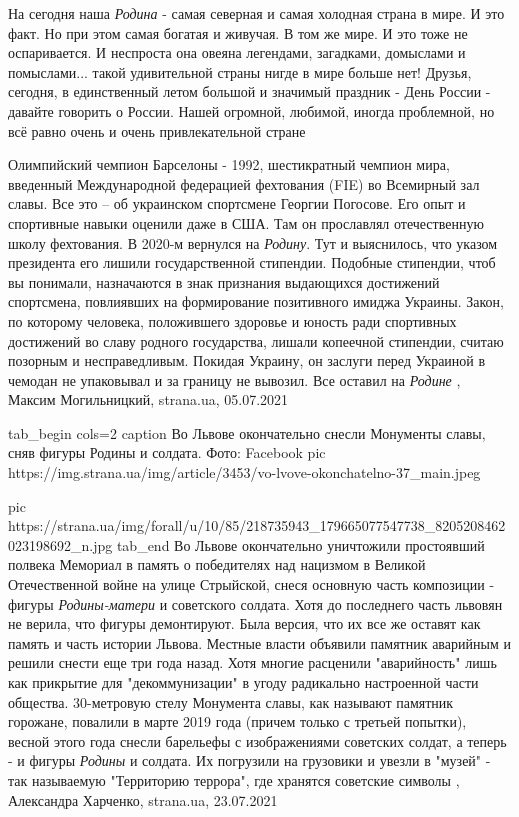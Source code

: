 На сегодня наша \emph{Родина} - самая северная и самая холодная страна в мире. И это
факт. Но при этом самая богатая и живучая. В том же мире. И это тоже не
оспаривается. И неспроста она овеяна легендами, загадками, домыслами и
помыслами... такой удивительной страны нигде в мире больше нет!  Друзья,
сегодня, в единственный летом большой и значимый праздник - День России -
давайте говорить о России. Нашей огромной, любимой, иногда проблемной, но всё
равно очень и очень привлекательной стране
  

Олимпийский чемпион Барселоны - 1992, шестикратный чемпион мира, введенный
Международной федерацией фехтования (FIE) во Всемирный зал славы. Все это – об
украинском спортсмене Георгии Погосове.  Его опыт и спортивные навыки оценили
даже в США. Там он прославлял отечественную школу фехтования. В 2020-м вернулся
на \emph{Родину}. Тут и выяснилось, что указом президента его лишили
государственной стипендии.  Подобные стипендии, чтоб вы понимали, назначаются в
знак признания выдающихся достижений спортсмена, повлиявших на формирование
позитивного имиджа Украины.  Закон, по которому человека, положившего здоровье
и юность ради спортивных достижений во славу родного государства, лишали
копеечной стипендии, считаю позорным и несправедливым. Покидая Украину, он
заслуги перед Украиной в чемодан не упаковывал и за границу не вывозил. Все
оставил на \emph{Родине}
, 
Максим Могильницкий, strana.ua, 05.07.2021


\ifcmt
  tab_begin cols=2
		 caption Во Львове окончательно снесли Монументы славы, сняв фигуры Родины и солдата. Фото: Facebook 
     pic https://img.strana.ua/img/article/3453/vo-lvove-okonchatelno-37_main.jpeg

     pic https://strana.ua/img/forall/u/10/85/218735943_179665077547738_8205208462023198692_n.jpg
  tab_end
\fi
Во Львове окончательно уничтожили простоявший полвека Мемориал в память о
победителях над нацизмом в Великой Отечественной войне на улице Стрыйской,
снеся основную часть композиции - фигуры \emph{Родины-матери} и советского
солдата.  Хотя до последнего часть львовян не верила, что фигуры демонтируют.
Была версия, что их все же оставят как память и часть истории Львова.  Местные
власти объявили памятник аварийным и решили снести еще три года назад.  Хотя
многие расценили "аварийность" лишь как прикрытие для "декоммунизации" в угоду
радикально настроенной части общества.  30-метровую стелу Монумента славы, как
называют памятник горожане, повалили в марте 2019 года (причем только с третьей
попытки), весной этого года снесли барельефы с изображениями советских солдат,
а теперь - и фигуры \emph{Родины} и солдата.  Их погрузили на грузовики и
увезли в "музей" - так называемую "Территорию террора", где хранятся советские
символы
, 
Александра Харченко, strana.ua, 23.07.2021

